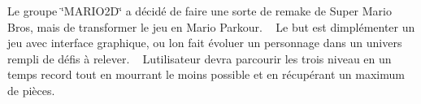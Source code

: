 Le groupe \char`\"{}\+MARIO2\+D\char`\"{} a décidé de faire une sorte de remake de Super Mario Bros, mais de transformer le jeu en Mario Parkour. ~\newline
Le but est d\textquotesingle{}implémenter un jeu avec interface graphique, ou l\textquotesingle{}on fait évoluer un personnage dans un univers rempli de défis à relever. ~\newline
L\textquotesingle{}utilisateur devra parcourir les trois niveau en un temps record tout en mourrant le moins possible et en récupérant un maximum de pièces. 